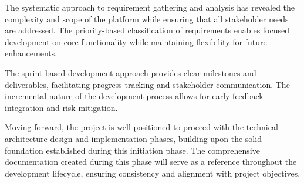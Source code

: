 The systematic approach to requirement gathering and analysis has revealed the complexity and scope of the platform while ensuring that all stakeholder needs are addressed. The priority-based classification of requirements enables focused development on core functionality while maintaining flexibility for future enhancements.

The sprint-based development approach provides clear milestones and deliverables, facilitating progress tracking and stakeholder communication. The incremental nature of the development process allows for early feedback integration and risk mitigation.

Moving forward, the project is well-positioned to proceed with the technical architecture design and implementation phases, building upon the solid foundation established during this initiation phase. The comprehensive documentation created during this phase will serve as a reference throughout the development lifecycle, ensuring consistency and alignment with project objectives.